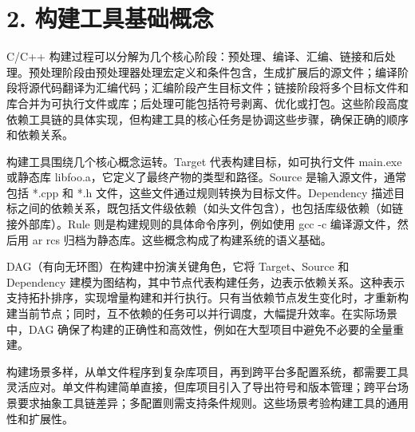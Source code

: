 \chapter{2. 构建工具基础概念}
C/C++ 构建过程可以分解为几个核心阶段：预处理、编译、汇编、链接和后处理。预处理阶段由预处理器处理宏定义和条件包含，生成扩展后的源文件；编译阶段将源代码翻译为汇编代码；汇编阶段产生目标文件；链接阶段将多个目标文件和库合并为可执行文件或库；后处理可能包括符号剥离、优化或打包。这些阶段高度依赖工具链的具体实现，但构建工具的核心任务是协调这些步骤，确保正确的顺序和依赖关系。\par
构建工具围绕几个核心概念运转。Target 代表构建目标，如可执行文件 main.exe 或静态库 libfoo.a，它定义了最终产物的类型和路径。Source 是输入源文件，通常包括 *.cpp 和 *.h 文件，这些文件通过规则转换为目标文件。Dependency 描述目标之间的依赖关系，既包括文件级依赖（如头文件包含），也包括库级依赖（如链接外部库）。Rule 则是构建规则的具体命令序列，例如使用 gcc -c 编译源文件，然后用 ar rcs 归档为静态库。这些概念构成了构建系统的语义基础。\par
DAG（有向无环图）在构建中扮演关键角色，它将 Target、Source 和 Dependency 建模为图结构，其中节点代表构建任务，边表示依赖关系。这种表示支持拓扑排序，实现增量构建和并行执行。只有当依赖节点发生变化时，才重新构建当前节点；同时，互不依赖的任务可以并行调度，大幅提升效率。在实际场景中，DAG 确保了构建的正确性和高效性，例如在大型项目中避免不必要的全量重建。\par
构建场景多样，从单文件程序到复杂库项目，再到跨平台多配置系统，都需要工具灵活应对。单文件构建简单直接，但库项目引入了导出符号和版本管理；跨平台场景要求抽象工具链差异；多配置则需支持条件规则。这些场景考验构建工具的通用性和扩展性。\par
